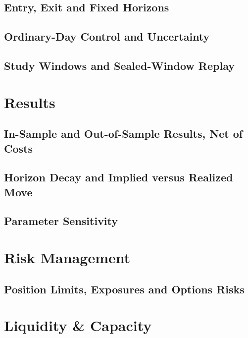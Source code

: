\documentclass[11pt,letterpaper]{article}
\begin{document}
\subsection{Entry, Exit and Fixed Horizons}
\subsection{Ordinary-Day Control and Uncertainty}
\subsection{Study Windows and Sealed-Window Replay}

\section{Results}
\subsection{In-Sample and Out-of-Sample Results, Net of Costs}
\subsection{Horizon Decay and Implied versus Realized Move}
\subsection{Parameter Sensitivity}

\section{Risk Management}
\subsection{Position Limits, Exposures and Options Risks}

\section{Liquidity \& Capacity}
\end{document}
